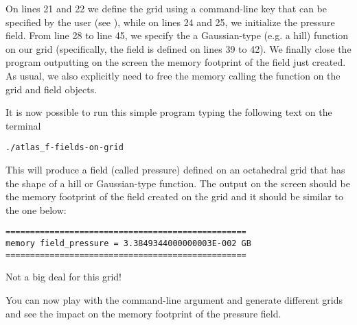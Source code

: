 On lines 21 and 22 we define the grid using a command-line key 
that can be specified by the user (see ), 
while on lines 24 and 25, we initialize the pressure field.
From line 28 to line 45, we specify the a Gaussian-type 
(e.g. a hill) function on our grid (specifically, the 
field is defined on lines 39 to 42).
We finally close the program outputting on the screen 
the memory footprint of the field just created. As usual,
we also explicitly need to free the memory calling the 
function  on the grid and field objects.

It is now possible to run this simple program typing
the following text on the terminal
%
\begin{lstlisting}[style=BashStyle]
./atlas_f-fields-on-grid
\end{lstlisting}
% 
This will produce a field (called pressure) defined 
on an octahedral grid that has the shape of a hill 
or Gaussian-type function.
The output on the screen should be the memory footprint 
of the field created on the grid and it should be similar 
to the one below:
%
\begin{lstlisting}[style=BashStyle]
=================================================
memory field_pressure = 3.3849344000000003E-002 GB
=================================================
\end{lstlisting}
% 
Not a big deal for this grid!

You can now play with the command-line argument and 
generate different grids and see the impact on the 
memory footprint of the pressure field.